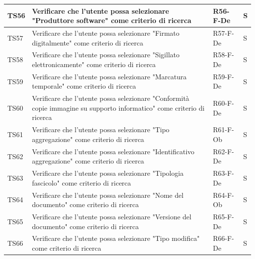 \documentclass[a4paper,12pt]{article}
\begin{document}
\begin{longtable}{|M{1.2cm}|M{6.3cm}|M{2.5cm}|M{1.5cm}|}
                TS56 & Verificare che l'utente possa selezionare "Produttore software" come criterio di ricerca & R56-F-De & S \\
                \hline

                TS57 & Verificare che l'utente possa selezionare "Firmato digitalmente" come criterio di ricerca & R57-F-De & S \\
                \hline

                TS58 & Verificare che l'utente possa selezionare "Sigillato elettronicamente" come criterio di ricerca & R58-F-De & S \\
                \hline

                TS59 & Verificare che l'utente possa selezionare "Marcatura temporale" come criterio di ricerca & R59-F-De & S \\
                \hline

                TS60 & Verificare che l'utente possa selezionare "Conformità copie immagine su supporto informatico" come criterio di ricerca & R60-F-De & S \\
                \hline

                TS61 & Verificare che l'utente possa selezionare "Tipo aggregazione" come criterio di ricerca & R61-F-Ob & S \\
                \hline

                TS62 & Verificare che l'utente possa selezionare "Identificativo aggregazione" come criterio di ricerca & R62-F-De & S \\
                \hline

                TS63 & Verificare che l'utente possa selezionare "Tipologia fascicolo" come criterio di ricerca & R63-F-De & S \\
                \hline

                TS64 & Verificare che l'utente possa selezionare "Nome del documento" come criterio di ricerca & R64-F-Ob & S \\
                \hline

                TS65 & Verificare che l'utente possa selezionare "Versione del documento" come criterio di ricerca & R65-F-De & S \\
                \hline

                TS66 & Verificare che l'utente possa selezionare "Tipo modifica" come criterio di ricerca & R66-F-De & S \\
                \hline


\end{longtable}
\end{document}

